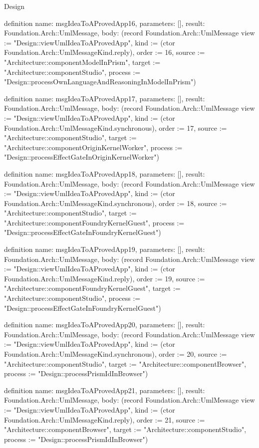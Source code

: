 \begin{lexlean}{Design}
\begin{semanticmodule}
definition{
  name: msgIdeaToAProvedApp16,
  parameters: [],
  result: Foundation.Arch::UmlMessage,
  body: (record Foundation.Arch::UmlMessage {view := "Design::viewUmlIdeaToAProvedApp", kind := (ctor Foundation.Arch::UmlMessageKind.reply), order := 16, source := "Architecture::componentModelInPrism", target := "Architecture::componentStudio", process := "Design::processOwnLanguageAndReasoningInModelInPrism"})
}

definition{
  name: msgIdeaToAProvedApp17,
  parameters: [],
  result: Foundation.Arch::UmlMessage,
  body: (record Foundation.Arch::UmlMessage {view := "Design::viewUmlIdeaToAProvedApp", kind := (ctor Foundation.Arch::UmlMessageKind.synchronous), order := 17, source := "Architecture::componentStudio", target := "Architecture::componentOriginKernelWorker", process := "Design::processEffectGateInOriginKernelWorker"})
}

definition{
  name: msgIdeaToAProvedApp18,
  parameters: [],
  result: Foundation.Arch::UmlMessage,
  body: (record Foundation.Arch::UmlMessage {view := "Design::viewUmlIdeaToAProvedApp", kind := (ctor Foundation.Arch::UmlMessageKind.synchronous), order := 18, source := "Architecture::componentStudio", target := "Architecture::componentFoundryKernelGuest", process := "Design::processEffectGateInFoundryKernelGuest"})
}

definition{
  name: msgIdeaToAProvedApp19,
  parameters: [],
  result: Foundation.Arch::UmlMessage,
  body: (record Foundation.Arch::UmlMessage {view := "Design::viewUmlIdeaToAProvedApp", kind := (ctor Foundation.Arch::UmlMessageKind.reply), order := 19, source := "Architecture::componentFoundryKernelGuest", target := "Architecture::componentStudio", process := "Design::processEffectGateInFoundryKernelGuest"})
}

definition{
  name: msgIdeaToAProvedApp20,
  parameters: [],
  result: Foundation.Arch::UmlMessage,
  body: (record Foundation.Arch::UmlMessage {view := "Design::viewUmlIdeaToAProvedApp", kind := (ctor Foundation.Arch::UmlMessageKind.synchronous), order := 20, source := "Architecture::componentStudio", target := "Architecture::componentBrowser", process := "Design::processPrismIdInBrowser"})
}

definition{
  name: msgIdeaToAProvedApp21,
  parameters: [],
  result: Foundation.Arch::UmlMessage,
  body: (record Foundation.Arch::UmlMessage {view := "Design::viewUmlIdeaToAProvedApp", kind := (ctor Foundation.Arch::UmlMessageKind.reply), order := 21, source := "Architecture::componentBrowser", target := "Architecture::componentStudio", process := "Design::processPrismIdInBrowser"})
}


\end{semanticmodule}
\end{lexlean}
